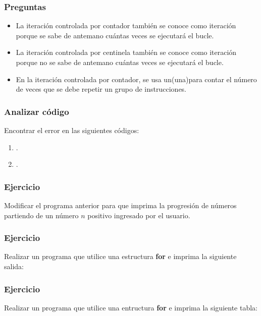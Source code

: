 \subsubsection{Preguntas}
\begin{itemize}
  \item La iteración controlada por contador también se conoce como iteración \underspace porque se sabe de antemano cuántas veces se ejecutará el bucle.
  \item La iteración controlada por centinela también se conoce como iteración \underspace porque no se sabe de antemano cuántas veces se ejecutará el bucle.
  \item En la iteración controlada por contador, se usa un(una)\underspace  para contar el número de veces que se debe repetir un grupo de instrucciones.
\end{itemize}

\subsubsection{Analizar código}
Encontrar el error en las siguientes códigos:
\begin{enumerate}
  \item .
  
  \item .
  
\end{enumerate}

\subsubsection{Ejercicio}
Modificar el programa anterior para que imprima la progresión de números partiendo de un número $n$ positivo ingresado por el usuario. 
{\small
  \lstset{inputencoding=utf8/latin1}
  
}

\subsubsection{Ejercicio}
Realizar un programa que utilice una estructura \textbf{for} e imprima la siguiente salida:
{\small
  \lstset{inputencoding=utf8/latin1}
  
}

\subsubsection{Ejercicio}
Realizar un programa que utilice una entructura \textbf{for} e imprima la siguiente tabla:
{\small
  \lstset{inputencoding=utf8/latin1}
  
}

